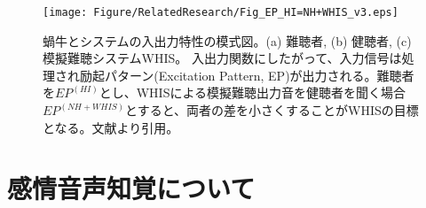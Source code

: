 
\begin{figure}[t]
   \vspace{-50pt}
   \centerline{\texttt{[image: Figure/RelatedResearch/Fig\_EP\_HI=NH+WHIS\_v3.eps]}}
   \vspace{0pt}
   \caption{蝸牛とシステムの入出力特性の模式図。(a) 難聴者, (b) 健聴者, (c) 模擬難聴システムWHIS。
   入出力関数にしたがって、入力信号は処理され励起パターン(Excitation Pattern, EP)が出力される。難聴者を$EP^{(HI)}$とし、WHISによる模擬難聴出力音を健聴者を聞く場合$EP^{(NH+WHIS)}$とすると、両者の差を小さくすることがWHISの目標となる。文献\cite{irino2023hearing}より引用。
 }
 \vspace{-15pt}
 \label{fig:EP_HI=NH+WHIS}
 \end{figure}




\clearpage
\section{感情音声知覚について}
\label{sec:EmoPercep}

